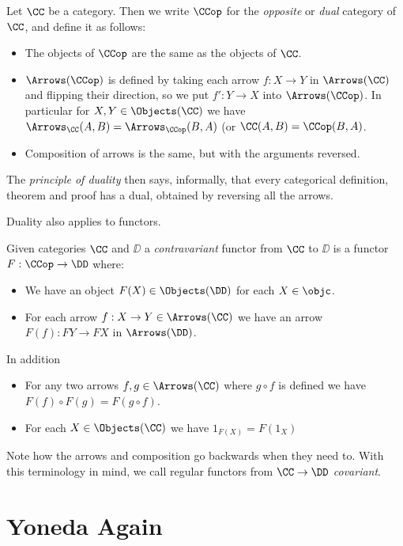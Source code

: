 \begin{defn}
Let $\CC$ be a category. Then we write $\CCop$ for the {\it opposite} or {\it dual}
category of $\CC$, and define it as follows:
\begin{itemize}
\item The objects of $\CCop$ are the same as the objects of $\CC$.
\item $\Arrows(\CCop)$ is defined by taking each arrow $f :X \to Y$ in $\Arrows(\CC)$ and
flipping their direction, so we put $f': Y \to X$ into $\Arrows(\CCop)$. In particular for
$X, Y \in \Objects(\CC)$ we have $\Arrows_{\CC}(A, B) = \Arrows_{\CCop}(B, A)$ (or $\CC(A,
B) = \CCop(B, A)$.
\item Composition of arrows is the same, but with the arguments reversed.
\end{itemize}
\end{defn}
\noindent
The {\it principle of duality} then says, informally, that every categorical definition,
theorem and proof has a dual, obtained by reversing all the arrows.

Duality also applies to functors.

\begin{defn}
Given categories $\CC$ and $\DD$ a {\it contravariant} functor from $\CC$ to $\DD$ is a
functor $F: \CCop \to \DD$ where:
\begin{itemize}
\item We have an object $F(X) \in \Objects(\DD)$ for each $X \in \objc$.
\item For each arrow $f : X \to Y \in \Arrows(\CC)$ we have an arrow $F(f): FY \to FX$ in $\Arrows(\DD)$.
\end{itemize}
\goodbreak
\noindent
In addition
\begin{itemize}
\item For any two arrows $f, g \in \Arrows(\CC)$ where $g \circ f$ is defined we have
$F(f) \circ F(g) = F(g \circ f)$.
\item For each $X \in \Objects(\CC)$ we have $1_{F(X)} = F(1_X)$
\end{itemize}

\end{defn}
\noindent
Note how the arrows and composition go backwards when they need to. With this terminology
in mind, we call regular functors from $\CC \to \DD$ {\it covariant}.

\section{Yoneda Again}

